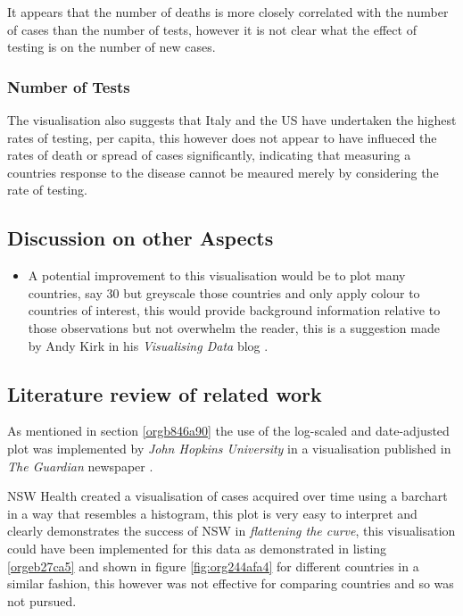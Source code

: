 \documentclass[11pt]{article}
\begin{document}
It appears that the number of deaths is more closely correlated with the number of cases than the number of tests, however it is not clear what the effect of testing is on the number of new cases.
\subsubsection{Number of Tests}
\label{sec:orgb87d931}
The visualisation also suggests that Italy and the US have undertaken the highest rates of testing, per capita, this
however does not appear to have influeced the rates of death or spread of cases significantly, indicating that measuring a countries response to the disease cannot be meaured merely by considering the rate of testing.


\subsection{Discussion on other Aspects}
\label{sec:org3171162}
\begin{itemize}
\item A potential improvement to this visualisation would be to plot many countries, say 30 but greyscale those countries and only apply colour to countries of interest, this would provide background information relative to those observations but not overwhelm the reader, this is a suggestion made by Andy Kirk in his \emph{Visualising Data} blog  \cite{kirk2015}.
\end{itemize}
\subsection{Literature review of related work}
\label{sec:org37574a5}
As mentioned in section \ref{orgb846a90} the use of the log-scaled and date-adjusted plot
was implemented by \emph{John Hopkins University} in a visualisation published in
\emph{The Guardian} newspaper \cite{gutierrez2020}.


NSW Health created a visualisation of cases acquired over time using a barchart
in a way that resembles a histogram, \cite{nswhealth2020} this plot is very easy
to interpret and clearly demonstrates the success of NSW in \emph{flattening the
curve}, this visualisation could have been implemented for this data as demonstrated in listing \ref{orgeb27ca5} and shown in figure \ref{fig:org244afa4} for different countries in a similar fashion, this however was not effective for comparing countries and so was not pursued.
\end{document}
